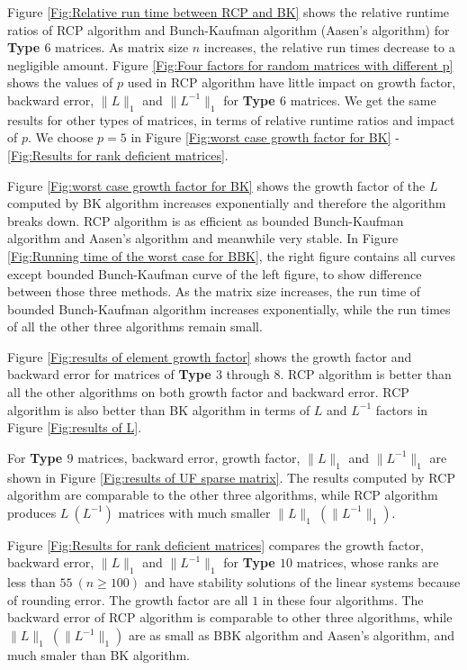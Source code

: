 \documentclass[11pt]{article}
\begin{document}
Figure \ref{Fig:Relative run time between RCP and BK} shows the relative runtime ratios of RCP algorithm and Bunch-Kaufman algorithm (Aasen's algorithm) for {\bf Type $6$} matrices. As matrix size $n$ increases, the relative run times decrease to a negligible amount. Figure \ref{Fig:Four factors for random matrices with different p} shows the values of $p$ used in RCP algorithm have little impact on growth factor, backward error, $\|L\|_1$ and $\|L^{-1}\|_1$ for {\bf Type $6$} matrices. We get the same results for other types of matrices, in terms of relative runtime ratios and impact of $p$. We choose $p=5$ in Figure \ref{Fig:worst case growth factor for BK} - \ref{Fig:Results for rank deficient matrices}.

Figure \ref{Fig:worst case growth factor for BK} shows the growth factor of the $L$ computed by BK algorithm increases exponentially and therefore the algorithm breaks down. RCP algorithm is as efficient as bounded Bunch-Kaufman algorithm and Aasen's algorithm and meanwhile very stable. In Figure \ref{Fig:Running time of the worst case for BBK}, the right figure contains all curves except bounded Bunch-Kaufman curve of the left figure, to show difference between those three methods. As the matrix size increases, the run time of bounded Bunch-Kaufman algorithm increases exponentially, while the run times of all the other three algorithms remain small.

Figure \ref{Fig:results of element growth factor} shows the growth factor and backward error for matrices of {\bf Type $3$} through {\bf $8$}. RCP algorithm is better than all the other algorithms on both growth factor and backward error. RCP algorithm is also better than BK algorithm in terms of $L$ and $L^{-1}$ factors in Figure
\ref{Fig:results of L}.

For {\bf Type $9$} matrices, backward error, growth factor, $\|L\|_1$ and $\|L^{-1}\|_1$ are shown in Figure \ref{Fig:results of UF sparse matrix}. The results computed by RCP algorithm are comparable to the other three algorithms, while RCP algorithm produces $L~(L^{-1})$ matrices with much smaller $\|L\|_1~(\|L^{-1}\|_1)$.

Figure \ref{Fig:Results for rank deficient matrices} compares the growth factor, backward error, $\|L\|_1$ and $\|L^{-1}\|_1$ for {\bf Type $10$} matrices, whose ranks are less than $55~(n \ge 100)$ and have stability solutions of the linear systems because of rounding error. The growth factor are all $1$ in these four algorithms. The backward error of RCP algorithm is comparable to other three algorithms, while $\|L\|_1~(\|L^{-1}\|_1)$ are as small as BBK algorithm and Aasen's algorithm, and much smaler than BK algorithm.
\end{document}
